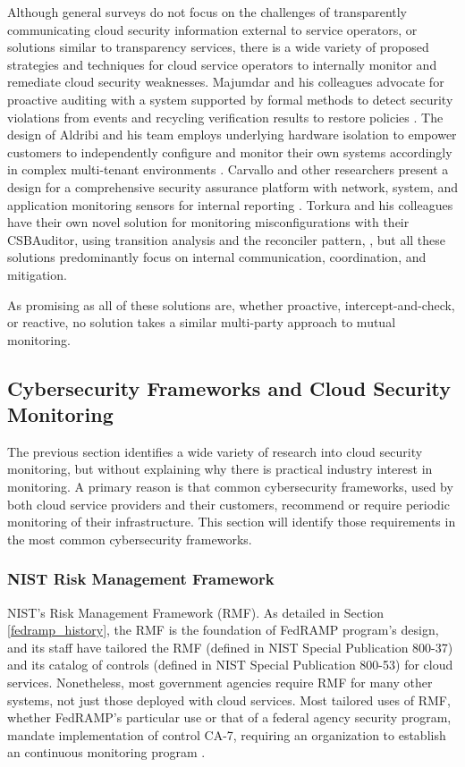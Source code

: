 \documentclass{jdf}
\begin{document}
Although general surveys do not focus on the challenges of transparently communicating cloud security information external to service operators, or solutions similar to transparency services, there is a wide variety of proposed strategies and techniques for cloud service operators to internally monitor and remediate cloud security weaknesses. Majumdar and his colleagues advocate for proactive auditing with a system supported by formal methods to detect security violations from events and recycling verification results to restore policies \citeyear[p.~2518]{majumdar22}. The design of Aldribi and his team employs underlying hardware isolation to empower customers to independently configure and monitor their own systems accordingly in complex multi-tenant environments \citeyear{aldribi15}. Carvallo and other researchers present a design for a comprehensive security assurance platform with network, system, and application monitoring sensors for internal reporting \citeyear{carvallo17}. Torkura and his colleagues have their own novel solution for monitoring misconfigurations with their CSBAuditor, using transition analysis and the reconciler pattern, \citeyear{torkura21}, but all these solutions predominantly focus on internal communication, coordination, and mitigation.

As promising as all of these solutions are, whether proactive, intercept-and-check, or reactive, no solution takes a similar multi-party approach to mutual monitoring.

\subsection{Cybersecurity Frameworks and Cloud Security Monitoring}

The previous section identifies a wide variety of research into cloud security monitoring, but without explaining why there is practical industry interest in monitoring. A primary reason is that common cybersecurity frameworks, used by both cloud service providers and their customers, recommend or require periodic monitoring of their infrastructure. This section will identify those requirements in the most common cybersecurity frameworks.

\subsubsection{NIST Risk Management Framework} \label{rmf}

NIST's Risk Management Framework (RMF). As detailed in Section \ref{fedramp_history}, the RMF is the foundation of FedRAMP program's design, and its staff have tailored the RMF (defined in NIST Special Publication 800-37) and its catalog of controls (defined in NIST Special Publication 800-53) for cloud services. Nonetheless, most government agencies require RMF for many other systems, not just those deployed with cloud services. Most tailored uses of RMF, whether FedRAMP's particular use or that of a federal agency security program, mandate implementation of control CA-7, requiring an organization to establish an continuous monitoring program \citeyear[pp.~90-91]{sp80053r5}.
\end{document}
